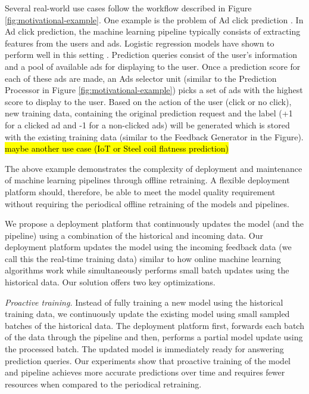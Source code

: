 Several real-world use cases follow the workflow described in Figure \ref{fig:motivational-example}.
One example is the problem of Ad click prediction \cite{macmahan2013}.
In Ad click prediction, the machine learning pipeline typically consists of extracting features from the users and ads. 
Logistic regression models have shown to perform well in this setting \cite{macmahan2013}.
Prediction queries consist of the user's information and a pool of available ads for displaying to the user.
Once a prediction score for each of these ads are made, an Ads selector unit (similar to the Prediction Processor in Figure \ref{fig:motivational-example}) picks a set of ads with the highest score to display to the user.
Based on the action of the user (click or no click), new training data, containing the original prediction request and the label (+1 for a clicked ad and -1 for a non-clicked ads) will be generated which is stored with the existing training data (similar to the Feedback Generator in the Figure).
\hl{maybe another use case (IoT or Steel coil flatness prediction)}

The above example demonstrates the complexity of deployment and maintenance of machine learning pipelines through offline retraining.
A flexible deployment platform should, therefore, be able to meet the model quality requirement without requiring the periodical offline retraining of the models and pipelines.

We propose a deployment platform that continuously updates the model (and the pipeline) using a combination of the historical and incoming data.
Our deployment platform updates the model using the incoming feedback data (we call this the real-time training data) similar to how online machine learning algorithms work while simultaneously performs small batch updates using the historical data.
Our solution offers two key optimizations.

\textit{Proactive training.}
Instead of fully training a new model using the historical training data, we continuously update the existing model using small sampled batches of the historical data.
The deployment platform first, forwards each batch of the data through the pipeline and then, performs a partial model update using the processed batch.
The updated model is immediately ready for answering prediction queries.
Our experiments show that proactive training of the model and pipeline achieves more accurate predictions over time and requires fewer resources when compared to the periodical retraining.

